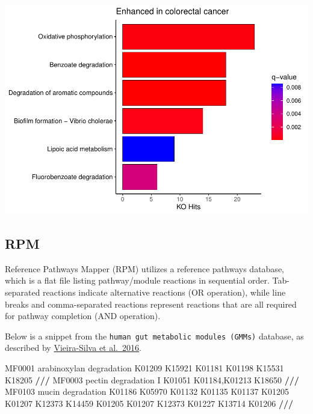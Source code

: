 \documentclass[
]{article}
\newenvironment{Shaded}{\begin{snugshade}}{\end{snugshade}}
\newcommand{\ErrorTok}[1]{\textcolor[rgb]{0.64,0.00,0.00}{\textbf{#1}}}
\newcommand{\NormalTok}[1]{#1}
\newcommand{\SpecialCharTok}[1]{\textcolor[rgb]{0.81,0.36,0.00}{\textbf{#1}}}
\begin{document}
\includegraphics{workshop_files/figure-latex/unnamed-chunk-58-1.pdf}

\hypertarget{rpm}{%
\subsection{RPM}\label{rpm}}

Reference Pathways Mapper (RPM) utilizes a reference pathways database,
which is a flat file listing pathway/module reactions in sequential
order. Tab-separated reactions indicate alternative reactions (OR
operation), while line breaks and comma-separated reactions represent
reactions that are all required for pathway completion (AND operation).

Below is a snippet from the
\texttt{human\ gut\ metabolic\ modules\ (GMMs)} database, as described
by \href{https://www.nature.com/articles/nmicrobiol201688}{Vieira-Silva
et al.~2016}.

\begin{Shaded}
\begin{Highlighting}[]
\NormalTok{MF0001  arabinoxylan degradation}
\NormalTok{K01209  K15921  K01181  K01198  K15531  K18205}
\SpecialCharTok{/}\ErrorTok{//}
\NormalTok{MF0003  pectin degradation I}
\NormalTok{K01051}
\NormalTok{K01184,K01213   K18650}
\SpecialCharTok{/}\ErrorTok{//}
\NormalTok{MF0103  mucin degradation}
\NormalTok{K01186}
\NormalTok{K05970}
\NormalTok{K01132  K01135  K01137  K01205}
\NormalTok{K01207  K12373  K14459}
\NormalTok{K01205  K01207  K12373  K01227  K13714}
\NormalTok{K01206}
\SpecialCharTok{/}\ErrorTok{//}
\end{Highlighting}
\end{Shaded}
\end{document}
